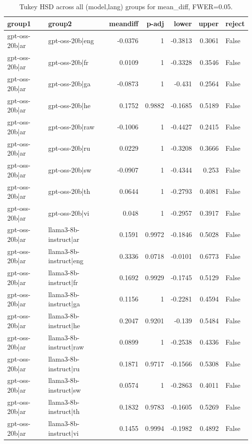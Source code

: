 \begin{table}
\caption{Tukey HSD across all (model,lang) groups for mean_diff, FWER=0.05.}
\label{tab:tukey_all_models_all_langs_mean_diff}
\begin{tabular}{l l r r r r l}
\toprule
group1 & group2 & meandiff & p-adj & lower & upper & reject \\
\midrule
gpt-oss-20b|ar & gpt-oss-20b|eng & -0.0376 & 1 & -0.3813 & 0.3061 & False \\
gpt-oss-20b|ar & gpt-oss-20b|fr & 0.0109 & 1 & -0.3328 & 0.3546 & False \\
gpt-oss-20b|ar & gpt-oss-20b|ga & -0.0873 & 1 & -0.431 & 0.2564 & False \\
gpt-oss-20b|ar & gpt-oss-20b|he & 0.1752 & 0.9882 & -0.1685 & 0.5189 & False \\
gpt-oss-20b|ar & gpt-oss-20b|raw & -0.1006 & 1 & -0.4427 & 0.2415 & False \\
gpt-oss-20b|ar & gpt-oss-20b|ru & 0.0229 & 1 & -0.3208 & 0.3666 & False \\
gpt-oss-20b|ar & gpt-oss-20b|sw & -0.0907 & 1 & -0.4344 & 0.253 & False \\
gpt-oss-20b|ar & gpt-oss-20b|th & 0.0644 & 1 & -0.2793 & 0.4081 & False \\
gpt-oss-20b|ar & gpt-oss-20b|vi & 0.048 & 1 & -0.2957 & 0.3917 & False \\
gpt-oss-20b|ar & llama3-8b-instruct|ar & 0.1591 & 0.9972 & -0.1846 & 0.5028 & False \\
gpt-oss-20b|ar & llama3-8b-instruct|eng & 0.3336 & 0.0718 & -0.0101 & 0.6773 & False \\
gpt-oss-20b|ar & llama3-8b-instruct|fr & 0.1692 & 0.9929 & -0.1745 & 0.5129 & False \\
gpt-oss-20b|ar & llama3-8b-instruct|ga & 0.1156 & 1 & -0.2281 & 0.4594 & False \\
gpt-oss-20b|ar & llama3-8b-instruct|he & 0.2047 & 0.9201 & -0.139 & 0.5484 & False \\
gpt-oss-20b|ar & llama3-8b-instruct|raw & 0.0899 & 1 & -0.2538 & 0.4336 & False \\
gpt-oss-20b|ar & llama3-8b-instruct|ru & 0.1871 & 0.9717 & -0.1566 & 0.5308 & False \\
gpt-oss-20b|ar & llama3-8b-instruct|sw & 0.0574 & 1 & -0.2863 & 0.4011 & False \\
gpt-oss-20b|ar & llama3-8b-instruct|th & 0.1832 & 0.9783 & -0.1605 & 0.5269 & False \\
gpt-oss-20b|ar & llama3-8b-instruct|vi & 0.1455 & 0.9994 & -0.1982 & 0.4892 & False \\

\end{tabular}
\end{table}
